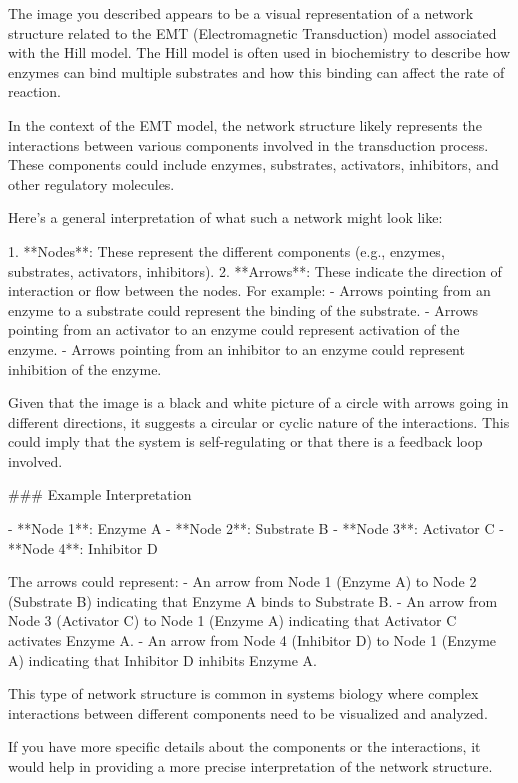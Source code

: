 The image you described appears to be a visual representation of a network structure related to the EMT (Electromagnetic Transduction) model associated with the Hill model. The Hill model is often used in biochemistry to describe how enzymes can bind multiple substrates and how this binding can affect the rate of reaction.

In the context of the EMT model, the network structure likely represents the interactions between various components involved in the transduction process. These components could include enzymes, substrates, activators, inhibitors, and other regulatory molecules.

Here's a general interpretation of what such a network might look like:

1. **Nodes**: These represent the different components (e.g., enzymes, substrates, activators, inhibitors).
2. **Arrows**: These indicate the direction of interaction or flow between the nodes. For example:
   - Arrows pointing from an enzyme to a substrate could represent the binding of the substrate.
   - Arrows pointing from an activator to an enzyme could represent activation of the enzyme.
   - Arrows pointing from an inhibitor to an enzyme could represent inhibition of the enzyme.

Given that the image is a black and white picture of a circle with arrows going in different directions, it suggests a circular or cyclic nature of the interactions. This could imply that the system is self-regulating or that there is a feedback loop involved.

### Example Interpretation

- **Node 1**: Enzyme A
- **Node 2**: Substrate B
- **Node 3**: Activator C
- **Node 4**: Inhibitor D

The arrows could represent:
- An arrow from Node 1 (Enzyme A) to Node 2 (Substrate B) indicating that Enzyme A binds to Substrate B.
- An arrow from Node 3 (Activator C) to Node 1 (Enzyme A) indicating that Activator C activates Enzyme A.
- An arrow from Node 4 (Inhibitor D) to Node 1 (Enzyme A) indicating that Inhibitor D inhibits Enzyme A.

This type of network structure is common in systems biology where complex interactions between different components need to be visualized and analyzed.

If you have more specific details about the components or the interactions, it would help in providing a more precise interpretation of the network structure.